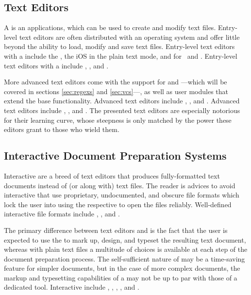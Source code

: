 \documentclass{book}
\begin{document}

\subsection{Text Editors}
A  is an applications, which can be used to create and modify
text files. Entry-level text editors are often distributed with an operating
system and offer little beyond the ability to load, modify and save text files.
Entry-level text editors with a  include the ,
the iOS  in the plain text mode, and  for \Linux\ and
. Entry-level text editors with a  include
,  , and
.

More advanced text editors come with the support for 
and ---which will be covered in sections \ref{sec:regexs}
and \ref{sec:vcs}---, as well as user modules that extend the base
functionality.  Advanced  text editors include ,
, and . Advanced  text editors include
, , and . The presented 
text editors are especially notorious for their learning curve, whose steepness
is only matched by the power these editors grant to those who wield them.

\subsection{Interactive Document Preparation Systems}
Interactive  are a breed of text
editors that produces fully-formatted text documents instead of (or along with)
text files. The reader is advices to avoid interactive  that use
proprietary, undocumented, and obscure file formats which lock the user into
using the respective  to open the files reliably. Well-defined
interactive  file formats include , ,
and .

The primary difference between text editors and  is the fact that
the user is expected to use the  to mark up, design, and typeset the
resulting text document, whereas with plain text files a multitude of choices is
available at each step of the document preparation process. The self-sufficient
nature of  may be a time-saving feature for simpler documents, but
in the case of more complex documents, the markup and typesetting capabilities
of a  may not be up to par with those of a dedicated tool.
Interactive  include , ,
, , and .
\end{document}

